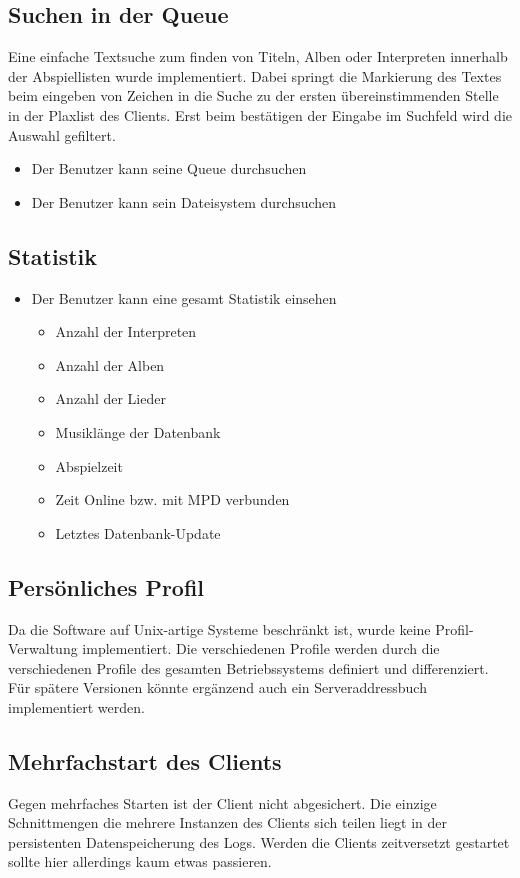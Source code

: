 \subsection{Suchen in der Queue}
Eine einfache Textsuche zum finden von Titeln, Alben oder Interpreten innerhalb der 
Abspiellisten wurde implementiert. Dabei springt die Markierung des Textes beim 
eingeben von Zeichen in die Suche zu der ersten übereinstimmenden Stelle in der 
Plaxlist des Clients. Erst beim bestätigen der Eingabe im Suchfeld wird die Auswahl 
gefiltert.
\begin{itemize}
	\item Der Benutzer kann seine Queue durchsuchen
	\item Der Benutzer kann sein Dateisystem durchsuchen
\end{itemize}
\subsection{Statistik}
\begin{itemize}
	\item Der Benutzer kann eine gesamt Statistik einsehen
	\begin{itemize}
		\item Anzahl der Interpreten
		\item Anzahl der Alben
		\item Anzahl der Lieder
		\item Musiklänge der Datenbank
		\item Abspielzeit	
		\item Zeit Online bzw. mit MPD verbunden
		\item Letztes Datenbank-Update
	\end{itemize}
\end{itemize}

\subsection{Persönliches Profil}
Da die Software auf Unix-artige Systeme beschränkt ist, wurde keine Profil-Verwaltung implementiert. Die
verschiedenen Profile werden durch die verschiedenen Profile des gesamten Betriebssystems definiert und differenziert.
Für spätere Versionen könnte ergänzend auch ein Serveraddressbuch implementiert werden.
\subsection{Mehrfachstart des Clients}
Gegen mehrfaches Starten ist der Client nicht abgesichert. Die einzige Schnittmengen die mehrere Instanzen des Clients sich teilen 
liegt in der persistenten Datenspeicherung des Logs. Werden die Clients zeitversetzt gestartet sollte hier allerdings kaum etwas passieren. 

